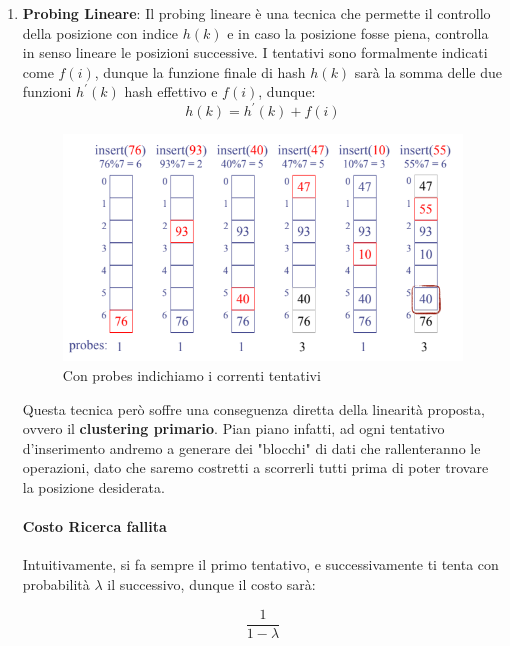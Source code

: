 \documentclass{article}
\begin{document}
\begin{enumerate}
    \item \textbf{Probing Lineare}: Il probing lineare è una tecnica che permette il controllo della posizione con indice $h(k)$ e in caso la posizione fosse piena, controlla in senso lineare le posizioni successive. I tentativi sono formalmente indicati come $f(i)$, dunque la funzione finale di hash $h(k)$ sarà la somma delle due funzioni $h^{'}(k)$ hash effettivo e $f(i)$, dunque:
    \begin{equation}
        h(k)=h^{'}(k)+f(i)
    \end{equation}

    \begin{figure}[htbp]
        \center
        \includegraphics[scale=0.65]{img/probingLineare.png}
        \caption{Con probes indichiamo i correnti tentativi}
    \end{figure}

    Questa tecnica però soffre una conseguenza diretta della linearità proposta, ovvero il \textbf{clustering primario}. Pian piano infatti, ad ogni tentativo d'inserimento andremo a generare dei "blocchi" di dati che rallenteranno le operazioni, dato che saremo costretti a scorrerli tutti prima di poter trovare la posizione desiderata.

    \paragraph{Costo Ricerca fallita} Intuitivamente, si fa sempre il primo tentativo, e successivamente ti tenta con probabilità $\lambda$ il successivo, dunque il costo sarà:

    \begin{equation}
        \frac{1}{1-\lambda}
    \end{equation}
    

\end{enumerate}
\end{document}
